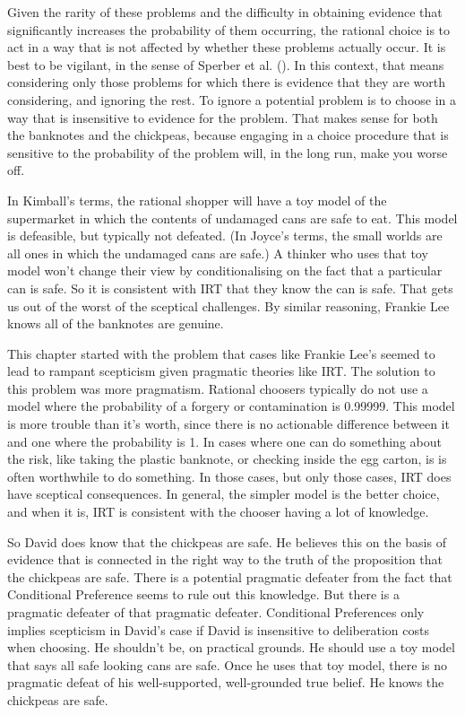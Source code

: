 \documentclass[
  10pt,
  letterpaper,
  twoside]{scrbook}
\begin{document}
Given the rarity of these problems and the difficulty in obtaining
evidence that significantly increases the probability of them occurring,
the rational choice is to act in a way that is not affected by whether
these problems actually occur. It is best to be vigilant, in the sense
of Sperber et al. (). In this
context, that means considering only those problems for which there is
evidence that they are worth considering, and ignoring the rest. To
ignore a potential problem is to choose in a way that is insensitive to
evidence for the problem. That makes sense for both the banknotes and
the chickpeas, because engaging in a choice procedure that is sensitive
to the probability of the problem will, in the long run, make you worse
off.

In Kimball's terms, the rational shopper will have a toy model of the
supermarket in which the contents of undamaged cans are safe to eat.
This model is defeasible, but typically not defeated. (In Joyce's terms,
the small worlds are all ones in which the undamaged cans are safe.) A
thinker who uses that toy model won't change their view by
conditionalising on the fact that a particular can is safe. So it is
consistent with IRT that they know the can is safe. That gets us out of
the worst of the sceptical challenges. By similar reasoning, Frankie Lee
knows all of the banknotes are genuine.

This chapter started with the problem that cases like Frankie Lee's
seemed to lead to rampant scepticism given pragmatic theories like IRT.
The solution to this problem was more pragmatism. Rational choosers
typically do not use a model where the probability of a forgery or
contamination is 0.99999. This model is more trouble than it's worth,
since there is no actionable difference between it and one where the
probability is 1. In cases where one can do something about the risk,
like taking the plastic banknote, or checking inside the egg carton, is
is often worthwhile to do something. In those cases, but only those
cases, IRT does have sceptical consequences. In general, the simpler
model is the better choice, and when it is, IRT is consistent with the
chooser having a lot of knowledge.

So David does know that the chickpeas are safe. He believes this on the
basis of evidence that is connected in the right way to the truth of the
proposition that the chickpeas are safe. There is a potential pragmatic
defeater from the fact that Conditional Preference seems to rule out
this knowledge. But there is a pragmatic defeater of that pragmatic
defeater. Conditional Preferences only implies scepticism in David's
case if David is insensitive to deliberation costs when choosing. He
shouldn't be, on practical grounds. He should use a toy model that says
all safe looking cans are safe. Once he uses that toy model, there is no
pragmatic defeat of his well-supported, well-grounded true belief. He
knows the chickpeas are safe.
\end{document}
